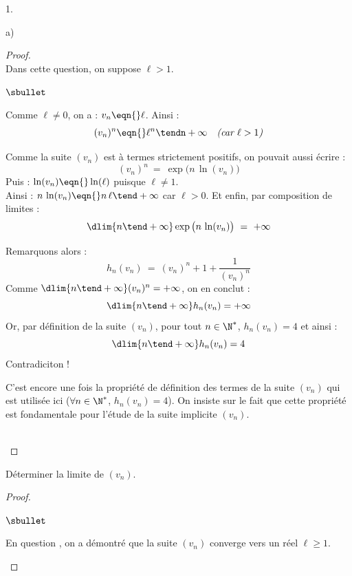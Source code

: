 \documentclass[11pt]{article}%
\begin{document}
\begin{noliste}{1.}
\begin{noliste}{a)}
    \begin{proof}~\\%
      Dans cette question, on suppose $\ell > 1$.
      \begin{noliste}{$\sbullet$}
      \item Comme $\ell \neq 0$, on a : $v_n \eqn{} \ell$. Ainsi :
        \[
        (v_n)^n \eqn{} \ell^n \tendn +\infty \quad \text{\it (car
          $\ell > 1$)}
        \]
        \begin{remark}%
          Comme la suite $(v_n)$ est à termes strictement positifs, on
          pouvait aussi écrire :
            \[
            (v_n)^n \ = \ \exp\big( n \, \ln(v_n) \big)
            \]
            Puis : $\ln(v_n) \eqn{} \ln(\ell)$ puisque $\ell \neq
            1$.\\
            Ainsi : $n \, \ln(v_n) \eqn{} n \, \ell \tend +\infty$ car
            $\ell > 0$. Et enfin, par composition de limites :
            \[
            \dlim{n \tend +\infty} \exp\big( n \, \ln(v_n) \big) \ = \
            +\infty
            \]
        \end{remark}

      \item Remarquons alors : 
        \[
        h_n(v_n) \ = \ (v_n)^n + 1 + \dfrac{1}{(v_n)^n}
        \]
        Comme $\dlim{n \tend +\infty} (v_n)^n = +\infty$, on en
        conclut : 
        \[
        \dlim{n \tend +\infty} h_n(v_n) = +\infty
        \]
        Or, par définition de la suite $(v_n)$, pour tout $n \in
        \N^*$, $h_n(v_n) = 4$ et ainsi :
        \[
        \dlim{n \tend +\infty} h_n(v_n) = 4
        \]
        Contradiciton !
      \end{noliste}
        \begin{remark}
          C'est encore une fois la propriété de définition des termes
          de la suite $(v_n)$ qui est utilisée ici ($\forall n \in
          \N^*$, $h_n(v_n) = 4$). On insiste sur le fait que cette
          propriété est fondamentale pour l'étude de la suite
          implicite $(v_n)$.
        \end{remark}~\\[-1.6cm]
    \end{proof}


    \newpage

    
  \item Déterminer la limite de $(v_n)$.

    \begin{proof}~%
      \begin{noliste}{$\sbullet$}
      \item En question , on a démontré que la suite
        $(v_n)$ converge vers un réel $\ell \geq 1$.


\end{noliste}
\end{proof}
\end{noliste}
\end{noliste}
\end{document}
